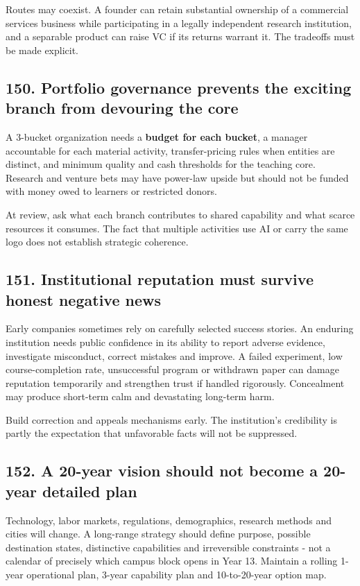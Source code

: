 Routes may coexist. A founder can retain substantial ownership of a commercial services business while participating in a legally independent research institution, and a separable product can raise VC if its returns warrant it. The tradeoffs must be made explicit.

\subsection{150. Portfolio governance prevents the exciting branch from devouring the core}

A 3-bucket organization needs a \textbf{budget for each bucket}, a manager accountable for each material activity, transfer-pricing rules when entities are distinct, and minimum quality and cash thresholds for the teaching core. Research and venture bets may have power-law upside but should not be funded with money owed to learners or restricted donors.

At review, ask what each branch contributes to shared capability and what scarce resources it consumes. The fact that multiple activities use AI or carry the same logo does not establish strategic coherence.

\subsection{151. Institutional reputation must survive honest negative news}

Early companies sometimes rely on carefully selected success stories. An enduring institution needs public confidence in its ability to report adverse evidence, investigate misconduct, correct mistakes and improve. A failed experiment, low course-completion rate, unsuccessful program or withdrawn paper can damage reputation temporarily and strengthen trust if handled rigorously. Concealment may produce short-term calm and devastating long-term harm.

Build correction and appeals mechanisms early. The institution's credibility is partly the expectation that unfavorable facts will not be suppressed.

\subsection{152. A 20-year vision should not become a 20-year detailed plan}

Technology, labor markets, regulations, demographics, research methods and cities will change. A long-range strategy should define purpose, possible destination states, distinctive capabilities and irreversible constraints - not a calendar of precisely which campus block opens in Year 13. Maintain a rolling 1-year operational plan, 3-year capability plan and 10-to-20-year option map.

